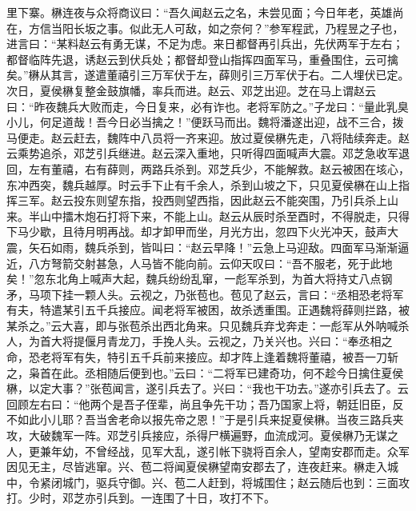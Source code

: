 里下寨。楙连夜与众将商议曰：“吾久闻赵云之名，未尝见面；今日年老，英雄尚在，方信当阳长坂之事。似此无人可敌，如之奈何？”参军程武，乃程昱之子也，进言曰：“某料赵云有勇无谋，不足为虑。来日都督再引兵出，先伏两军于左右；都督临阵先退，诱赵云到伏兵处；都督却登山指挥四面军马，重叠围住，云可擒矣。”楙从其言，遂遣董禧引三万军伏于左，薛则引三万军伏于右。二人埋伏已定。次日，夏侯楙复整金鼓旗幡，率兵而进。赵云、邓芝出迎。芝在马上谓赵云曰：“昨夜魏兵大败而走，今日复来，必有诈也。老将军防之。”子龙曰：“量此乳臭小儿，何足道哉！吾今日必当擒之！”便跃马而出。魏将潘遂出迎，战不三合，拨马便走。赵云赶去，魏阵中八员将一齐来迎。放过夏侯楙先走，八将陆续奔走。赵云乘势追杀，邓芝引兵继进。赵云深入重地，只听得四面喊声大震。邓芝急收军退回，左有董禧，右有薛则，两路兵杀到。邓芝兵少，不能解救。赵云被困在垓心，东冲西突，魏兵越厚。时云手下止有千余人，杀到山坡之下，只见夏侯楙在山上指挥三军。赵云投东则望东指，投西则望西指，因此赵云不能突围，乃引兵杀上山来。半山中擂木炮石打将下来，不能上山。赵云从辰时杀至酉时，不得脱走，只得下马少歇，且待月明再战。却才卸甲而坐，月光方出，忽四下火光冲天，鼓声大震，矢石如雨，魏兵杀到，皆叫曰：“赵云早降！”云急上马迎敌。四面军马渐渐逼近，八方弩箭交射甚急，人马皆不能向前。云仰天叹曰：“吾不服老，死于此地矣！”忽东北角上喊声大起，魏兵纷纷乱窜，一彪军杀到，为首大将持丈八点钢矛，马项下挂一颗人头。云视之，乃张苞也。苞见了赵云，言曰：“丞相恐老将军有夫，特遣某引五千兵接应。闻老将军被困，故杀透重围。正遇魏将薛则拦路，被某杀之。”云大喜，即与张苞杀出西北角来。只见魏兵弃戈奔走：一彪军从外呐喊杀人，为首大将提偃月青龙刀，手挽人头。云视之，乃关兴也。兴曰：“奉丞相之命，恐老将军有失，特引五千兵前来接应。却才阵上逢着魏将董禧，被吾一刀斩之，枭首在此。丞相随后便到也。”云曰：“二将军已建奇功，何不趁今日擒住夏侯楙，以定大事？”张苞闻言，遂引兵去了。兴曰：“我也干功去。”遂亦引兵去了。云回顾左右曰：“他两个是吾子侄辈，尚且争先干功；吾乃国家上将，朝廷旧臣，反不如此小儿耶？吾当舍老命以报先帝之恩！”于是引兵来捉夏侯楙。当夜三路兵夹攻，大破魏军一阵。邓芝引兵接应，杀得尸横遍野，血流成河。夏侯楙乃无谋之人，更兼年幼，不曾经战，见军大乱，遂引帐下骁将百余人，望南安郡而走。众军因见无主，尽皆逃窜。兴、苞二将闻夏侯楙望南安郡去了，连夜赶来。楙走入城中，令紧闭城门，驱兵守御。兴、苞二人赶到，将城围住；赵云随后也到：三面攻打。少时，邓芝亦引兵到。一连围了十日，攻打不下。

